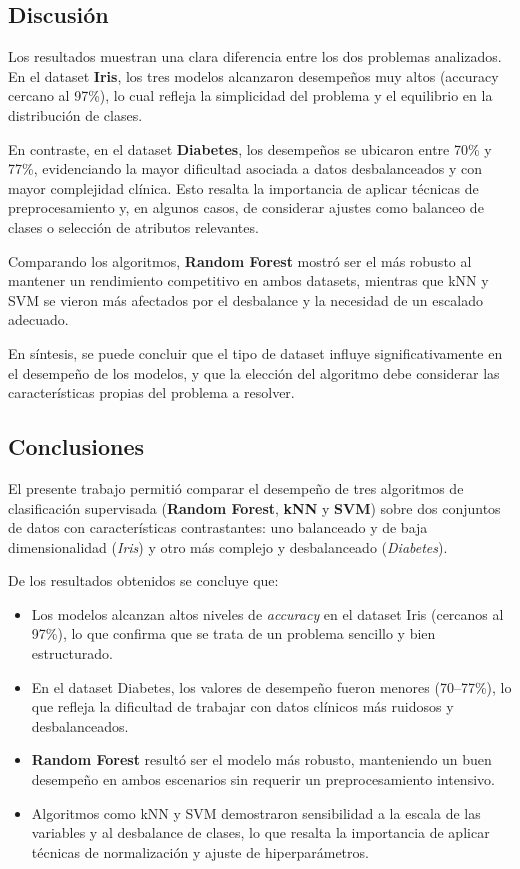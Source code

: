 \documentclass[a4paper,12pt]{article}
\begin{document}
\subsection{Discusión}
Los resultados muestran una clara diferencia entre los dos problemas analizados. 
En el dataset \textbf{Iris}, los tres modelos alcanzaron desempeños muy altos 
(accuracy cercano al 97\%), lo cual refleja la simplicidad del problema y el 
equilibrio en la distribución de clases.  

En contraste, en el dataset \textbf{Diabetes}, los desempeños se ubicaron entre 
70\% y 77\%, evidenciando la mayor dificultad asociada a datos desbalanceados 
y con mayor complejidad clínica. Esto resalta la importancia de aplicar técnicas 
de preprocesamiento y, en algunos casos, de considerar ajustes como balanceo de 
clases o selección de atributos relevantes.  

Comparando los algoritmos, \textbf{Random Forest} mostró ser el más robusto al 
mantener un rendimiento competitivo en ambos datasets, mientras que kNN y SVM 
se vieron más afectados por el desbalance y la necesidad de un escalado adecuado.  

En síntesis, se puede concluir que el tipo de dataset influye significativamente 
en el desempeño de los modelos, y que la elección del algoritmo debe considerar 
las características propias del problema a resolver.

\subsection{Conclusiones}
El presente trabajo permitió comparar el desempeño de tres algoritmos de 
clasificación supervisada (\textbf{Random Forest}, \textbf{kNN} y \textbf{SVM}) 
sobre dos conjuntos de datos con características contrastantes: uno balanceado 
y de baja dimensionalidad (\textit{Iris}) y otro más complejo y desbalanceado 
(\textit{Diabetes}).  

De los resultados obtenidos se concluye que:  
\begin{itemize}
    \item Los modelos alcanzan altos niveles de \textit{accuracy} en el dataset 
    Iris (cercanos al 97\%), lo que confirma que se trata de un problema sencillo 
    y bien estructurado.
    \item En el dataset Diabetes, los valores de desempeño fueron menores (70--77\%), 
    lo que refleja la dificultad de trabajar con datos clínicos más ruidosos y 
    desbalanceados.
    \item \textbf{Random Forest} resultó ser el modelo más robusto, manteniendo 
    un buen desempeño en ambos escenarios sin requerir un preprocesamiento 
    intensivo.
    \item Algoritmos como kNN y SVM demostraron sensibilidad a la escala de las 
    variables y al desbalance de clases, lo que resalta la importancia de aplicar 
    técnicas de normalización y ajuste de hiperparámetros.
\end{itemize}
\end{document}
